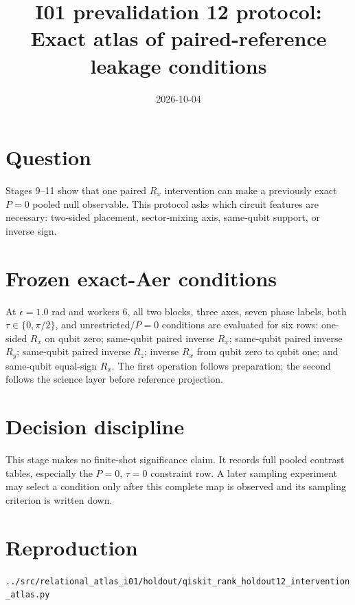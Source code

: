 \documentclass[11pt]{article}
\begin{document}
\title{I01 prevalidation 12 protocol:\\Exact atlas of paired-reference leakage conditions}
\date{2026-10-04}
\maketitle

\section*{Question}
Stages 9--11 show that one paired $R_x$ intervention can make a previously exact
$P=0$ pooled null observable. This protocol asks which circuit features are
necessary: two-sided placement, sector-mixing axis, same-qubit support, or inverse
sign.

\section*{Frozen exact-Aer conditions}
At $\epsilon=1.0$ rad and workers 6, all two blocks, three axes, seven phase labels,
both $\tau\in\{0,\pi/2\}$, and unrestricted/$P=0$ conditions are evaluated for six
rows: one-sided $R_x$ on qubit zero; same-qubit paired inverse $R_x$; same-qubit
paired inverse $R_y$; same-qubit paired inverse $R_z$; inverse $R_x$ from qubit zero
to qubit one; and same-qubit equal-sign $R_x$. The first operation follows
preparation; the second follows the science layer before reference projection.

\section*{Decision discipline}
This stage makes no finite-shot significance claim. It records full pooled contrast
tables, especially the $P=0$, $\tau=0$ constraint row. A later sampling experiment
may select a condition only after this complete map is observed and its sampling
criterion is written down.

\section*{Reproduction}
\texttt{../src/relational\_atlas\_i01/holdout/qiskit\_rank\_holdout12\_intervention\_atlas.py}
\end{document}
